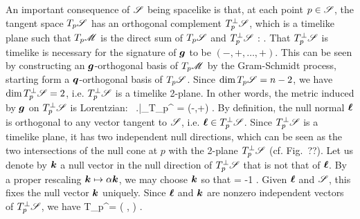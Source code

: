 An important consequence of $\mathscr{S}$ being spacelike is that, at each point
$p\in \mathscr{S}$, the tangent space $T_p\mathscr{S}$ has an orthogonal complement
$T_p^\perp\mathscr{S}$,  which is a timelike plane such that
$T_p\mathscr{M}$ is the direct sum of $T_p\mathscr{S}$ and $T_p^\perp\mathscr{S}$ :
\be \label{e:def:TM_direct_sum}
   .
\ee
That $T_p^\perp\mathscr{S}$ is timelike is necessary for the signature of $\bm{g}$
to be $(-,+,\ldots,+)$. This can be seen by constructing an $\bm{g}$-orthogonal
basis of $T_p\mathscr{M}$ by the Gram-Schmidt process, starting form a
$\bm{q}$-orthogonal basis of $T_p\mathscr{S}$. Since $\dim T_p\mathscr{S} = n-2$, we have
$\dim T_p^\perp\mathscr{S} = 2$, i.e. $T_p^\perp\mathscr{S}$ is a timelike 2-plane.
In other words, the metric induced by $\bm{g}$ on
$T_p^\perp\mathscr{S}$ is Lorentzian:
\be
    \, \left.\right|_{T_p^\perp\Sp} = (-,+) .
\ee
By definition, the null normal $\bm{\ell}$ is orthogonal to any vector
tangent to $\mathscr{S}$, i.e. $\bm{\ell} \in T_p^\perp\mathscr{S}$.
Since $T_p^\perp\mathscr{S}$ is a timelike plane, it has two independent null directions,
which can be seen as the two intersections of the null cone at $p$ with
the 2-plane $T_p^\perp\mathscr{S}$ (cf. Fig.~??).
Let us denote by $\bm{k}$ a null vector in the null direction of $T_p^\perp\mathscr{S}$
that is not that of $\bm{\ell}$. By a proper rescaling $\bm{k}\mapsto \alpha\bm{k}$,
we may choose $\bm{k}$ so that
\be \label{e:def:k_el_minus_one}
        \cdot\wl = -1 .
\ee
Given $\bm{\ell}$ and $\mathscr{S}$, this fixes the null vector $\bm{k}$ uniquely.
Since $\bm{\ell}$ and $\bm{k}$ are nonzero independent vectors of $T_p^\perp\mathscr{S}$, we
have
\be \label{e:def:TSperp_Span_k_l}
    T_p^\perp\Sp = \left( \wl,  \right) .
\ee

